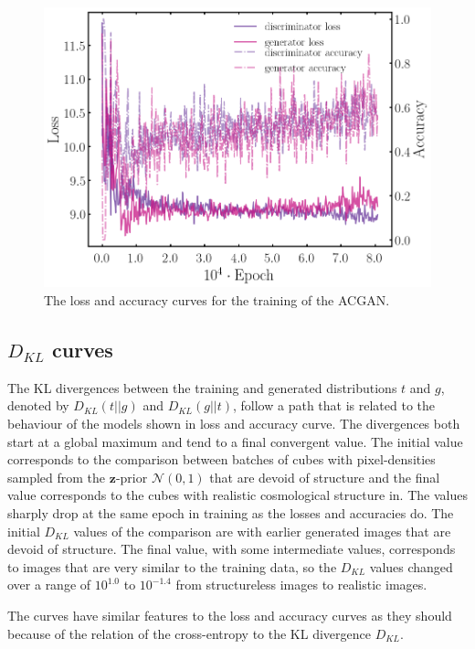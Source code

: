 \documentclass[twocolumn]{article}
\numberwithin{equation}{section}
\begin{document}
\begin{figure}[!ht]%
\includegraphics[width=\columnwidth]{figures/graphs/metrics.png}
\centering
\caption{The loss and accuracy curves for the training of the ACGAN.}
\label{fig:acgan_losscurve}
\end{figure}

\subsection{$D_{KL}$ curves}

The KL divergences between the training and generated distributions $t$ and $g$, denoted by $D_{KL}(t||g)$ and 
$D_{KL}(g||t)$, follow a path that is related to the behaviour of the models shown in loss and accuracy curve. The 
divergences both start at a global maximum and tend to a final convergent value. The initial value corresponds to the 
comparison between batches of cubes with pixel-densities sampled from the $\mathbf{z}$-prior $\mathcal{N}(0,1)$ that are
devoid of structure and the final value corresponds to the cubes with realistic cosmological structure in. The values 
sharply drop at the same epoch in training as the losses and accuracies do. The initial $D_{KL}$ values of the comparison 
are with earlier generated images that are devoid of structure. The final value, with some intermediate values, corresponds
to images that are very similar to the training data, so the $D_{KL}$ values changed over a range of $10^{1.0}$ to 
$10^{-1.4}$ from structureless images to realistic images.

The curves have similar features to the loss and accuracy curves as they should because of the relation of the 
cross-entropy to the KL divergence $D_{KL}$.
\end{document}
